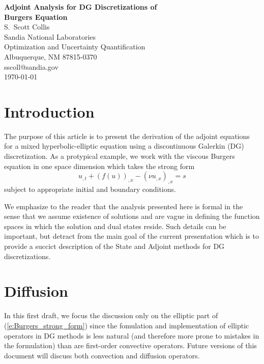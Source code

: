 \documentclass[12pt]{article}
\begin{document}
\begin{center}
{\Large\bf Adjoint Analysis for DG Discretizations of \\[0.5ex]
Burgers Equation}\\[2ex]
S.\ Scott Collis \\
Sandia National Laboratories \\
Optimization and Uncertainty Quantification \\
Albuquerque, NM 87815-0370 \\
sscoll@sandia.gov \\[1ex]
\today
\end{center}

\section{Introduction}

The purpose of this article is to present the derivation of the adjoint
equations for a mixed hyperbolic-elliptic equation using a discontinuous
Galerkin (DG) discretization.  As a protypical example, we work with the
viscous Burgers equation in one space dimension which takes the strong form
\begin{equation} \label{e:Burgers_strong_form}
u_{,t} + (f(u))_{,x} - (\nu u_{,x})_{,x} = s
\end{equation}
subject to appropriate initial and boundary conditions.

We emphasize to the reader that the analysis presented here is formal in the
sense that we assume existence of solutions and are vague in defining the
function spaces in which the solution and dual states reside.  Such details
can be important, but detract from the main goal of the current presentation
which is to provide a succict description of the State and Adjoint methods for
DG discretizations.


\section{Diffusion}

In this first draft, we focus the discussion only on the elliptic part of
(\ref{e:Burgers_strong_form}) since the fomulation and implementation of
elliptic operators in DG methods is less natural (and therefore more prone to
mistakes in the formulation) than are first-order convective operators.
Future versions of this document will discuss both convection and diffusion
operators.
\end{document}
